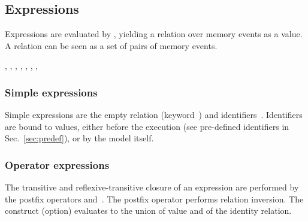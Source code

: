 \subsection{\label{language:expression}Expressions}
Expressions are evaluated by \herd, yielding a relation over memory events
as a value.
A relation can be seen as a set of pairs of memory events.
\begin{syntax}
 \is{} 
\alt {}
\alt {}\T{*} \orelse {}\T{+} \orelse {}
\orelse {}
\alt {}\T{|} \orelse
{}\T{;} \orelse
{}\T{\textbackslash} \orelse
{}\T{\&}
\alt {}\T{(}\T{)}
\alt {} \T{(}  \T{)}
\alt {} \T{(}  \T{)} \T{->} 
\alt {}  \brepet{}   \erepet{}  
\alt {}   \brepet{}   \erepet{}  
\alt \T{(}\T{)} \orelse  {}  
\sep
{} \is
{} \orelse
{} \orelse
{} \orelse
{} \orelse
{} \orelse
{} \orelse
{} \orelse
{} \orelse
{}
\alt
{} \orelse
{} \orelse
{} \orelse
{}
\alt
{} \orelse
{} \orelse
{}
\sep
{} \is \epsilon
\alt {} \brepet{} \T{,}  \erepet{}
\sep
{} \is \epsilon
\alt {} \brepet{} \T{,}  \erepet{}
\sep
{} \is {} \orelse {}
\sep
{} \is {} \T{=} 
\sep
{} \is {} \T{(}  \T{)} \T{=} 
\sep
\end{syntax}

\subsubsection*{Simple expressions}
Simple expressions are the empty relation (keyword~) and
identifiers~. Identifiers are bound to values, either
before the execution (see pre-defined identifiers in Sec.~\ref{sec:predef}),
or by the model itself.

\subsubsection*{Operator expressions}
The transitive and reflexive-transitive closure of an expression are performed
by the postfix operators \T{+} and~\T{*}.
The  postfix operator  performs relation inversion.
The construct  (option) evaluates to the union
of   value and of the identity relation.

